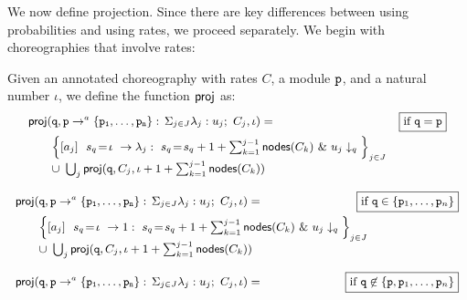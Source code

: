 %
We now define projection. Since there are key differences between using probabilities and using rates, we proceed separately. We begin with choreographies that involve rates:
% 
\begin{definition}\label{def:projCTMC} Given an
  annotated choreography with rates $C$, a module $\mathtt{p}$, and a
  natural number $\iota$, we define the function $\mathsf{proj}$ as:
  \begin{displaymath}\small
        \begin{array}{lr}

          \mathsf{proj} (\mathtt{q},\mathtt{p}\rightarrow^{a} \{\mathtt{\mathtt{p}_1,\ldots,\mathtt{p}_n}\}:\,\Sigma_{j\in J}\lambda_j: u_j;\ C_j, \iota)= 
          &  \boxed{\text{if }\mathtt{q}=\mathtt{p}}\\[2mm]
          \qquad
          \Big\{[a_j]\ \ s_{q}\!=\! \iota\ \rightarrow \lambda_j:\ s_{q}\!=\!
          s_{q} +1+\sum_{k=1}^{j-1}\mathsf{nodes}({C_k})\ \&\ u_j\downarrow_q\Big\}_{j\in J}
          \\
          \qquad\cup\ \bigcup_{j} \mathsf{proj} (\mathtt{q}, C_j, \iota+1+\sum_{k=1}^{j-1}\mathsf{nodes}({C_k}))
        \end{array}
      \end{displaymath}


  \begin{displaymath}\small
        \begin{array}{lr}


          \proj (\role q,\interactl{p}{a}{\role p_1,\ldots,\role p_n}, \iota)= 
          &  \!\!\!\!\!\! \!\!\!\!\!\!\boxed{\text{if }\role q\in\{\role p_1,\ldots,\role p_n\}}\\[2mm]
          \qquad
          \Big\{\commandBase {a_j} {\ s_{q}\!=\! \iota} {1:\ s_{q}\!=\!
          s_{q} +1+\sum_{k=1}^{j-1}\mathsf{nodes}({C_k})}\ \&\ \projE
          {u_j}q\Big\}_{j\in J}
          \\
          \qquad\cup\ \bigcup_{j} \proj (\role q, C_j, \iota+1+\sum_{k=1}^{j-1}\mathsf{nodes}({C_k}))

          \\\\

          \proj (\role q,\interactl{p}a{\role p_1,\ldots,\role p_n}, \iota)=
          &  \hspace{-1.8cm}\boxed{\text{if }\role q\not\in\{\role p, 
            \role p_1,\ldots,\role p_n\}}
          \\[2mm]


\end{array}
\end{displaymath}
\end{definition}

